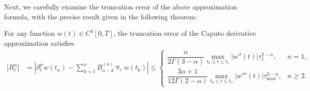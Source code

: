 \documentclass{siamart171218}
\theoremstyle{remark}
\theoremstyle{example}
\numberwithin{equation}{section}
\begin{document}
Next, we carefully examine the truncation error of the above approximation formula, with the precise result given in the following theorem:
\begin{theorem}\label{Th.2.1}
For any function $w(t) \in C^3[0, T ]$, the truncation error of the Caputo derivative approximation satisfies
\begin{align*}
\left|R_{t}^n\right| &= \left| \partial^\alpha_t w(t_{n}) - \sum_{k=1}^{n} B_{n-k}^{(n)}
\triangledown_\tau w(t_k) \right|
\leq \begin{cases}
\dfrac{\alpha}{2\Gamma(3-\alpha)} \max\limits_{t_0 \leq t \leq t_1} |w''(t)| \tau_{1}^{2-\alpha}, & n=1, \\[10pt]
\dfrac{3\alpha+1}{12\Gamma(2-\alpha)} \max\limits_{t_0 \leq t \leq t_n} |w'''(t)| \tau_{\text{max}}^{3-\alpha}, & n \geq 2.
\end{cases}
\end{align*}
\end{theorem}
\end{document}

